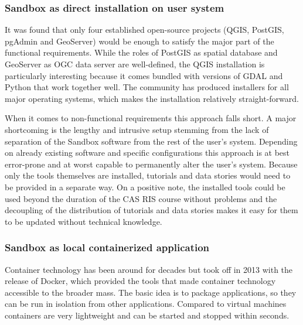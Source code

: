 \documentclass[11pt, a4paper, oneside, parskip=full-]{scrartcl}
\begin{document}
\subsubsection*{Sandbox as direct installation on user system}
It was found that only four established open-source projects (QGIS\cite{qgis},
PostGIS\cite{postgis}, pgAdmin\cite{pgadmin} and GeoServer\cite{geoserver})
would be enough to satisfy the major part of the functional requirements. While
the roles of PostGIS as spatial database and GeoServer as OGC data server are
well-defined, the QGIS installation is particularly interesting because it comes
bundled with versions of GDAL and Python that work together well. The community
has produced installers for all major operating systems, which makes the
installation relatively straight-forward.

When it comes to non-functional requirements this approach falls short. A major
shortcoming is the lengthy and intrusive setup stemming from the lack of
separation of the Sandbox software from the rest of the user's system. Depending
on already existing software and specific configurations this approach is at
best error-prone and at worst capable to permanently alter the user's system.
Because only the tools themselves are installed, tutorials and data stories
would need to be provided in a separate way. On a positive note, the installed
tools could be used beyond the duration of the CAS RIS course without problems
and the decoupling of the distribution of tutorials and data stories makes it
easy for them to be updated without technical knowledge.

\subsubsection*{Sandbox as local containerized application}
Container technology has been around for decades but took off in 2013 with the
release of Docker, which provided the tools that made container technology
accessible to the broader mass. The basic idea is to package applications, so
they can be run in isolation from other applications. Compared to virtual
machines containers are very lightweight and can be started and stopped within
seconds.
\end{document}
